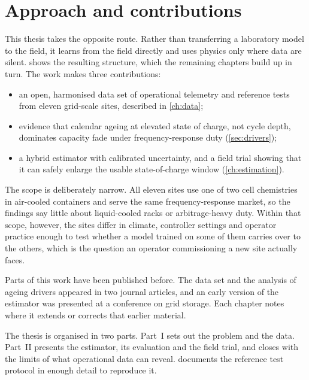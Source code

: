 \section{Approach and contributions}
\label{sec:contributions}

This thesis takes the opposite route. Rather than transferring a
laboratory model to the field, it learns from the field directly and uses
physics only where data are silent.  shows the
resulting structure, which the remaining chapters build up in turn. The
work makes three contributions:

\begin{itemize}
  \item an open, harmonised data set of operational telemetry and
    reference tests from eleven grid-scale sites, described in
    \cref{ch:data};
  \item evidence that calendar ageing at elevated state of charge, not
    cycle depth, dominates capacity fade under frequency-response duty
    (\cref{sec:drivers});
  \item a hybrid estimator with calibrated uncertainty, and a field trial
    showing that it can safely enlarge the usable state-of-charge window
    (\cref{ch:estimation}).
\end{itemize}

The scope is deliberately narrow. All eleven sites use one of two cell
chemistries in air-cooled containers and serve the same frequency-response
market, so the findings say little about liquid-cooled racks or
arbitrage-heavy duty. Within that scope, however, the sites differ in
climate, controller settings and operator practice enough to test whether
a model trained on some of them carries over to the others, which is the
question an operator commissioning a new site actually faces.

Parts of this work have been published before. The data set and the
analysis of ageing drivers appeared in two journal articles, and an early
version of the estimator was presented at a conference on grid storage.
Each chapter notes where it extends or corrects that earlier material.

The thesis is organised in two parts. Part~I sets out the problem and the
data. Part~II presents the estimator, its evaluation and the field trial,
and closes with the limits of what operational data can reveal.
 documents the reference test protocol in enough
detail to reproduce it.
